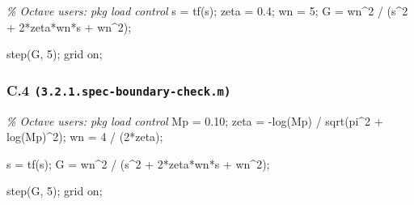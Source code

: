 \documentclass[
  11pt]{article}
\newenvironment{Shaded}{}{}
\newcommand{\CommentTok}[1]{\textcolor[rgb]{0.38,0.63,0.69}{\textit{#1}}}
\newcommand{\FloatTok}[1]{\textcolor[rgb]{0.25,0.63,0.44}{#1}}
\newcommand{\NormalTok}[1]{#1}
\newcommand{\OperatorTok}[1]{\textcolor[rgb]{0.40,0.40,0.40}{#1}}
\newcommand{\SpecialStringTok}[1]{\textcolor[rgb]{0.73,0.40,0.53}{#1}}
\newcommand{\VariableTok}[1]{\textcolor[rgb]{0.10,0.09,0.49}{#1}}
\begin{document}
\begin{Shaded}
\begin{Highlighting}[]
\CommentTok{\% Octave users: pkg load control}
\VariableTok{s} \OperatorTok{=} \VariableTok{tf}\NormalTok{(}\SpecialStringTok{\textquotesingle{}s\textquotesingle{}}\NormalTok{)}\OperatorTok{;}
\VariableTok{zeta} \OperatorTok{=} \FloatTok{0.4}\OperatorTok{;}
\VariableTok{wn} \OperatorTok{=} \FloatTok{5}\OperatorTok{;}
\VariableTok{G} \OperatorTok{=} \VariableTok{wn}\OperatorTok{\^{}}\FloatTok{2} \OperatorTok{/}\NormalTok{ (}\VariableTok{s}\OperatorTok{\^{}}\FloatTok{2} \OperatorTok{+} \FloatTok{2}\OperatorTok{*}\VariableTok{zeta}\OperatorTok{*}\VariableTok{wn}\OperatorTok{*}\VariableTok{s} \OperatorTok{+} \VariableTok{wn}\OperatorTok{\^{}}\FloatTok{2}\NormalTok{)}\OperatorTok{;}

\VariableTok{step}\NormalTok{(}\VariableTok{G}\OperatorTok{,} \FloatTok{5}\NormalTok{)}\OperatorTok{;}
\VariableTok{grid} \VariableTok{on}\OperatorTok{;}
\end{Highlighting}
\end{Shaded}

\subsubsection{\texorpdfstring{C.4
\texttt{(3.2.1.spec-boundary-check.m)}}{C.4 (3.2.1.spec-boundary-check.m)}}\label{c.4-3.2.1.spec-boundary-check.m}

\begin{Shaded}
\begin{Highlighting}[]
\CommentTok{\% Octave users: pkg load control}
\VariableTok{Mp} \OperatorTok{=} \FloatTok{0.10}\OperatorTok{;}
\VariableTok{zeta} \OperatorTok{=} \OperatorTok{{-}}\VariableTok{log}\NormalTok{(}\VariableTok{Mp}\NormalTok{) }\OperatorTok{/} \VariableTok{sqrt}\NormalTok{(}\VariableTok{pi}\OperatorTok{\^{}}\FloatTok{2} \OperatorTok{+} \VariableTok{log}\NormalTok{(}\VariableTok{Mp}\NormalTok{)}\OperatorTok{\^{}}\FloatTok{2}\NormalTok{)}\OperatorTok{;}
\VariableTok{wn} \OperatorTok{=} \FloatTok{4} \OperatorTok{/}\NormalTok{ (}\FloatTok{2}\OperatorTok{*}\VariableTok{zeta}\NormalTok{)}\OperatorTok{;}

\VariableTok{s} \OperatorTok{=} \VariableTok{tf}\NormalTok{(}\SpecialStringTok{\textquotesingle{}s\textquotesingle{}}\NormalTok{)}\OperatorTok{;}
\VariableTok{G} \OperatorTok{=} \VariableTok{wn}\OperatorTok{\^{}}\FloatTok{2} \OperatorTok{/}\NormalTok{ (}\VariableTok{s}\OperatorTok{\^{}}\FloatTok{2} \OperatorTok{+} \FloatTok{2}\OperatorTok{*}\VariableTok{zeta}\OperatorTok{*}\VariableTok{wn}\OperatorTok{*}\VariableTok{s} \OperatorTok{+} \VariableTok{wn}\OperatorTok{\^{}}\FloatTok{2}\NormalTok{)}\OperatorTok{;}

\VariableTok{step}\NormalTok{(}\VariableTok{G}\OperatorTok{,} \FloatTok{5}\NormalTok{)}\OperatorTok{;}
\VariableTok{grid} \VariableTok{on}\OperatorTok{;}
\end{Highlighting}
\end{Shaded}
\end{document}
